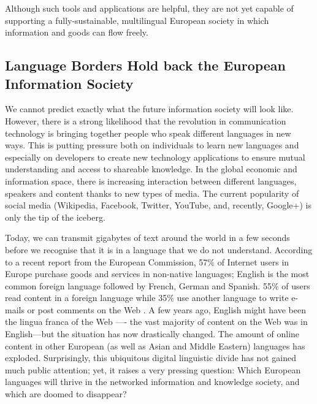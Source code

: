 \begin{multicols}{2}
Although such tools and applications are helpful, they are not yet capable of supporting a fully-sustainable, multilingual European society in which information and goods can flow freely.

\subsection[Language Borders Hold back the European Information Society]{Language Borders Hold back the European Information Society}

We cannot predict exactly what the future information society will look like. However, there is a strong likelihood that the revolution in communication technology is bringing together people who speak different languages in new ways. This is putting pressure both on individuals to learn new languages and especially on developers to create new technology applications to ensure mutual understanding and access to shareable knowledge. In the global economic and information space, there is increasing interaction between different languages, speakers and content thanks to new types of media. The current popularity of social media (Wikipedia, Facebook, Twitter, YouTube, and, recently, Google+) is only the tip of the iceberg.


Today, we can transmit gigabytes of text around the world in a few seconds before we recognise that it is in a language that we do not understand. According to a recent report from the European Commission, 57\% of Internet users in Europe purchase goods and services in non-native languages; English is the most common foreign language followed by French, German and Spanish. 55\% of users read content in a foreign language while 35\% use another language to write e-mails or post comments on the Web \cite{str2}. A few years ago, English might have been the lingua franca of the Web —- the vast majority of content on the Web was in English—but the situation has now drastically changed. The amount of online content in other European (as well as Asian and Middle Eastern) languages has exploded. Surprisingly, this ubiquitous digital linguistic divide has not gained much public attention; yet, it raises a very pressing question: Which European languages will thrive in the networked information and knowledge society, and which are doomed to disappear?


\end{multicols}
